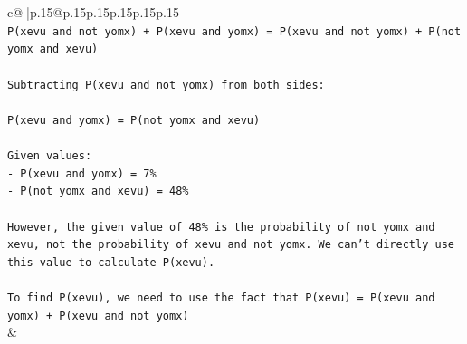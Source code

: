 \documentclass{article}
\begin{document}
{\begin{supertabular}{c@{$\;$}|p{.15\linewidth}@{}p{.15\linewidth}p{.15\linewidth}p{.15\linewidth}p{.15\linewidth}p{.15\linewidth}}
{{{\\ 
\texttt{P(xevu and not yomx) + P(xevu and yomx) = P(xevu and not yomx) + P(not yomx and xevu)} \\
\\ 
\texttt{Subtracting P(xevu and not yomx) from both sides:} \\
\\ 
\texttt{P(xevu and yomx) = P(not yomx and xevu)} \\
\\ 
\texttt{Given values:} \\
\texttt{{-} P(xevu and yomx) = 7\%} \\
\texttt{{-} P(not yomx and xevu) = 48\%} \\
\\ 
\texttt{However, the given value of 48\% is the probability of not yomx and xevu, not the probability of xevu and not yomx. We can't directly use this value to calculate P(xevu).} \\
\\ 
\texttt{To find P(xevu), we need to use the fact that P(xevu) = P(xevu and yomx) + P(xevu and not yomx)} \\
            }
        }
    }
    & \\ \\


\end{supertabular}}
\end{document}
